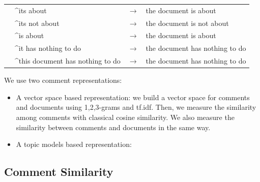 \begin{table}[tp]
\begin{center}
{\begin{tabular}{l lcl}
        &\^{}its about & $\longrightarrow$ & the document is about\\
        &\^{}its not about & $\longrightarrow$ & the document is not about\\
        &\^{}is about & $\longrightarrow$ & the document is about\\
\addlinespace        
        &\^{}it has nothing to do & $\longrightarrow$ & the document has nothing to do\\
        &\^{}this document has nothing to do & $\longrightarrow$ & the document has nothing to do\\
        \bottomrule
      \end{tabular}%
    } 
  \end{center}
\end{table}

We use two comment representations:
\begin{itemize}
\item A vector space based representation: we build a vector space for
  comments and documents using 1,2,3-grams and tf.idf.   
  Then, we measure the similarity among comments with classical cosine
  similarity. 
  We also measure the similarity between comments and documents in the
  same way.
\item A topic models based representation: 
\end{itemize}


\subsection{Comment Similarity}
\label{sec:comment-similarity}


